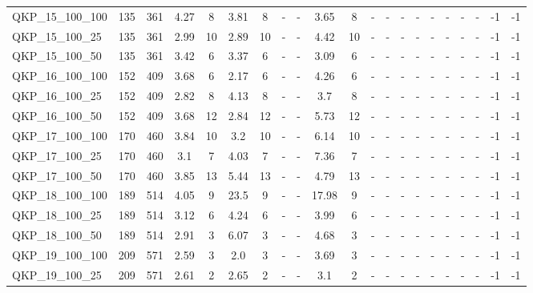 \begin{sidewaystable}[!ht]
{\begin{tabular}{lcccccccccccccccccccc}
QKP\_15\_100\_100 & 135 & 361 & 4.27 & 8 & 3.81 & 8 &  - &  - &  \textcolor{blue2}{3.65} & 8 &  - &  - &  - &  - &  - &  - &  - &  - & -1 & -1 \\
QKP\_15\_100\_25 & 135 & 361 & 2.99 & 10 &  \textcolor{blue2}{2.89} & 10 &  - &  - & 4.42 & 10 &  - &  - &  - &  - &  - &  - &  - &  - & -1 & -1 \\
QKP\_15\_100\_50 & 135 & 361 & 3.42 & 6 & 3.37 & 6 &  - &  - &  \textcolor{blue2}{3.09} & 6 &  - &  - &  - &  - &  - &  - &  - &  - & -1 & -1 \\
QKP\_16\_100\_100 & 152 & 409 & 3.68 & 6 &  \textcolor{blue2}{2.17} & 6 &  - &  - & 4.26 & 6 &  - &  - &  - &  - &  - &  - &  - &  - & -1 & -1 \\
QKP\_16\_100\_25 & 152 & 409 &  \textcolor{blue2}{2.82} & 8 & 4.13 & 8 &  - &  - & 3.7 & 8 &  - &  - &  - &  - &  - &  - &  - &  - & -1 & -1 \\
QKP\_16\_100\_50 & 152 & 409 & 3.68 & 12 &  \textcolor{blue2}{2.84} & 12 &  - &  - & 5.73 & 12 &  - &  - &  - &  - &  - &  - &  - &  - & -1 & -1 \\
QKP\_17\_100\_100 & 170 & 460 & 3.84 & 10 &  \textcolor{blue2}{3.2} & 10 &  - &  - & 6.14 & 10 &  - &  - &  - &  - &  - &  - &  - &  - & -1 & -1 \\
QKP\_17\_100\_25 & 170 & 460 &  \textcolor{blue2}{3.1} & 7 & 4.03 & 7 &  - &  - & 7.36 & 7 &  - &  - &  - &  - &  - &  - &  - &  - & -1 & -1 \\
QKP\_17\_100\_50 & 170 & 460 &  \textcolor{blue2}{3.85} & 13 & 5.44 & 13 &  - &  - & 4.79 & 13 &  - &  - &  - &  - &  - &  - &  - &  - & -1 & -1 \\
QKP\_18\_100\_100 & 189 & 514 &  \textcolor{blue2}{4.05} & 9 & 23.5 & 9 &  - &  - & 17.98 & 9 &  - &  - &  - &  - &  - &  - &  - &  - & -1 & -1 \\
QKP\_18\_100\_25 & 189 & 514 &  \textcolor{blue2}{3.12} & 6 & 4.24 & 6 &  - &  - & 3.99 & 6 &  - &  - &  - &  - &  - &  - &  - &  - & -1 & -1 \\
QKP\_18\_100\_50 & 189 & 514 &  \textcolor{blue2}{2.91} & 3 & 6.07 & 3 &  - &  - & 4.68 & 3 &  - &  - &  - &  - &  - &  - &  - &  - & -1 & -1 \\
QKP\_19\_100\_100 & 209 & 571 & 2.59 & 3 &  \textcolor{blue2}{2.0} & 3 &  - &  - & 3.69 & 3 &  - &  - &  - &  - &  - &  - &  - &  - & -1 & -1 \\
QKP\_19\_100\_25 & 209 & 571 &  \textcolor{blue2}{2.61} & 2 & 2.65 & 2 &  - &  - & 3.1 & 2 &  - &  - &  - &  - &  - &  - &  - &  - & -1 & -1 \\

\end{tabular}}
\end{sidewaystable}
